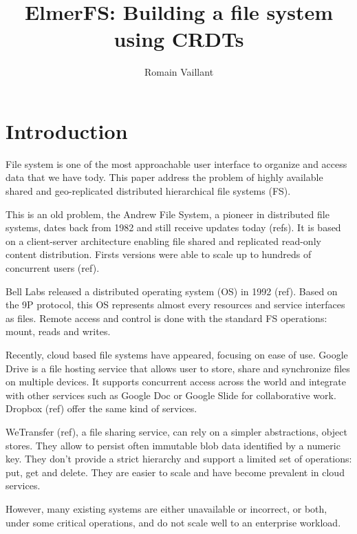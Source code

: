 \documentclass[sigplan, 10pt]{acmart}
\begin{document}
\author{Romain Vaillant}

\title{ElmerFS: Building a file system using CRDTs}

\begin{abstract}
\end{abstract}

\maketitle


\section{Introduction}


File system is one of the most approachable user interface to organize
and access data that we have tody. This paper address the problem
of highly available shared and geo-replicated distributed hierarchical
file systems (FS).

This is an old problem, the Andrew File System, a pioneer in distributed file
systems, dates back from 1982 and still receive updates today (refs).
It is based on a client-server architecture enabling file shared and
replicated read-only content distribution.
Firsts versions were able to scale up to hundreds of concurrent users (ref).

Bell Labs released a distributed operating system (OS) in 1992 (ref).
Based on the 9P protocol, this OS represents almost every resources and
service interfaces as files. Remote access and control is done with
the standard FS operations: mount, reads and writes.

Recently, cloud based file systems have appeared, focusing on ease of use.
Google Drive is a file hosting service that allows user to store, share and
synchronize files on multiple devices. It supports concurrent access across
the world and integrate with other services such as Google Doc or Google Slide
for collaborative work. Dropbox (ref) offer the same kind of services.

WeTransfer (ref), a file sharing service, can rely on a simpler abstractions,
object stores. They allow to persist often immutable blob data identified by a numeric key.
They don't provide a strict hierarchy and support a limited set of
operations: put, get and delete. They are easier to scale and have become
prevalent in cloud services.

However, many existing systems are either unavailable or incorrect, or both,
under some critical operations, and do not scale well to an enterprise
workload.
\end{document}
